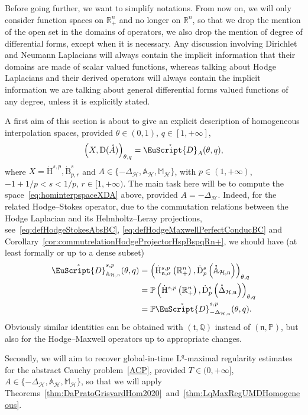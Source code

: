 \documentclass[10pt]{amsart}
\theoremstyle{definition}\newtheorem{defi}[theo]{Definition}\newtheorem{rema}[theo]{Remark}\newtheorem{exam}[theo]{Example}\newtheorem{exem}[theo]{Example}\newtheorem{nota}[theo]{Notation}
\newcommand{\bbP}{\mathbb{P}}
\newcommand{\bbA}{\mathbb{A}}
\newcommand{\bbR}{\mathbb{R}}
\newcommand{\bbM}{\mathbb{M}}
\newcommand{\bbQ}{\mathbb{Q}}
\newcommand{\rmH}{\mathrm{H}}%
\newcommand{\rmB}{\mathrm{B}}
\newcommand{\rmD}{\mathrm{D}}
\newcommand{\rmL}{\mathrm{L}}
\newcommand{\rgA}{\mathring{A}}
\newcommand{\clH}{\mathcal{H}}
\newcommand{\fkn}{\mathfrak{n}}
\newcommand{\fkt}{\mathfrak{t}}
\newcommand{\rgeusD}{\mathring{\eus{D}}}
\newcommand{\eus}{\EuScript}
\begin{document}
Before going further, we want to simplify notations. From now on, we will only consider function spaces on $\bbR^n_+$ and no longer on $\bbR^n$, so that we drop the mention of the open set in the domains of operators, we also drop the mention of degree of differential forms, except when it is necessary. Any discussion involving Dirichlet and Neumann Laplacians will always contain the implicit information that their domains are made of scalar valued functions, whereas talking about Hodge Laplacians and their derived operators will always contain the implicit information we are talking about general differential forms valued functions of any degree, unless it is explicitly stated.

A first aim of this section is about to give an explicit description of homogeneous interpolation spaces, provided $\theta\in (0,1)$, $q\in [1,+\infty]$,
\begin{align}\label{eq:hominterpspaceXDA}
\left(X,\rmD(\rgA)\right)_{\theta,q} = \rgeusD_{A}(\theta,q),
\end{align}
where $X=\dot{\rmH}^{s,p},\dot{\rmB}^{s}_{p,r}$ and $A\in\{ -\Delta_{\clH},\bbA_{\clH},\bbM_\clH\}$, with $p\in(1,+\infty)$, $-1+1/p<s<1/p$, $r\in[1,+\infty)$. The main task here will be to compute the space~\eqref{eq:hominterpspaceXDA} above, provided $A=-\Delta_{\clH}$. Indeed, for the related Hodge--Stokes operator, due to the commutation relations between the Hodge Laplacian and its Helmholtz--Leray projections, see~\eqref{eq:defHodgeStokesAbsBC}, \eqref{eq:defHodgeMaxwellPerfectConducBC} and Corollary~\ref{cor:commutrelationHodgeProjectorHspBspqRn+}, we should have (at least formally or up to a dense subset)
\begin{align*}
\rgeusD^{s,p}_{\bbA_{\clH,\fkn}}(\theta,q) &= \left(\dot{\rmH}^{s,p}_{\fkn,\sigma}\left(\bbR^n_+\right),\dot{\rmD}^{s}_{p}\left(\mathring{\bbA}_{\clH,\fkn}\right)\right)_{\theta,q} \\
&= \bbP\left(\dot{\rmH}^{s,p}\left(\bbR^n_+\right),\dot{\rmD}^{s}_{p}\left(\mathring{\Delta}_{\clH,\fkn}\right)\right)_{\theta,q} \\
&= \bbP\rgeusD^{s,p}_{-{\Delta}_{\clH,\fkn}}(\theta,q).
\end{align*}
Obviously similar identities can be obtained with $(\fkt,\bbQ)$ instead of $(\fkn,\bbP)$, but also for the Hodge--Maxwell operators up to appropriate changes.

Secondly, we will aim to recover global-in-time $\rmL^q$-maximal regularity estimates for the abstract Cauchy problem~\eqref{ACP}, provided $T\in(0,+\infty]$, $A\in\{ -\Delta_{\clH},\bbA_{\clH},\bbM_\clH\}$, so that we will apply Theorems~\ref{thm:DaPratoGrisvardHom2020}~and~\ref{thm:LqMaxRegUMDHomogeneous}.
\end{document}
